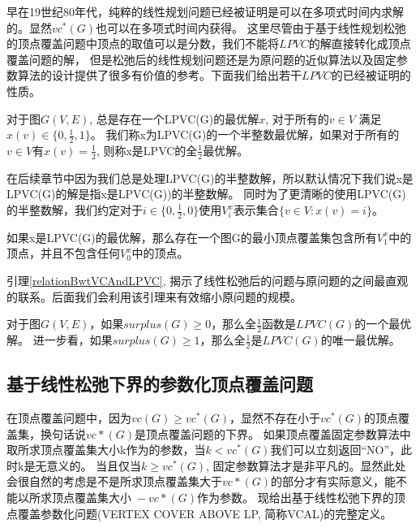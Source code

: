早在19世纪80年代，纯粹的线性规划问题已经被证明是可以在多项式时间内求解的\cite{khachiian1979polynomial}。显然$vc^{*}(G)$也可以在多项式时间内获得。
这里尽管由于基于线性规划松弛的顶点覆盖问题中顶点的取值可以是分数，我们不能将$LPVC$的解直接转化成顶点覆盖问题的解，
但是松弛后的线性规划问题还是为原问题的近似算法以及固定参数算法的设计提供了很多有价值的参考。下面我们给出若干$LPVC$的已经被证明的性质。
\begin{lemma}
对于图$G(V, E)$, 总是存在一个LPVC(G)的最优解$x$, 对于所有的$v \in V$ 满足$x(v) \in \{0, \frac{1}{2}, 1\}$。
我们称x为LPVC(G)的一个半整数最优解，如果对于所有的$v \in V$有$x(v) = \frac{1}{2}$, 则称x是LPVC的全$\frac{1}{2}$最优解。
\end{lemma}

在后续章节中因为我们总是处理LPVC(G)的半整数解，所以默认情况下我们说x是LPVC(G)的解是指x是LPVC(G))的半整数解。
同时为了更清晰的使用LPVC(G)的半整数解，我们约定对于$i \in \{0, \frac{1}{2}, 0\}$使用$V^x_i$表示集合$\{v \in V: x(v) = i\}$。

\begin{lemma}\label{relationBwtVCAndLPVC}
如果x是LPVC(G)的最优解，那么存在一个图G的最小顶点覆盖集包含所有$V^x_1$中的顶点，并且不包含任何$V^x_0$中的顶点。
\end{lemma}

引理\ref{relationBwtVCAndLPVC}, 揭示了线性松弛后的问题与原问题的之间最直观的联系。后面我们会利用该引理来有效缩小原问题的规模。

\begin{lemma}\label{relationBwtSurplusAndLPVC}
对于图$G(V, E)$，如果$surplus(G) \ge 0$，那么全$\frac{1}{2}$函数是$LPVC(G)$的一个最优解。
进一步看，如果$surplus(G) \ge 1$，那么全$\frac{1}{2}$是$LPVC(G)$的唯一最优解。
\end{lemma}

\subsection{基于线性松弛下界的参数化顶点覆盖问题}
在顶点覆盖问题中，因为$vc(G)\ge vc^*(G)$，显然不存在小于$vc^*(G)$的顶点覆盖集，换句话说$vc*(G)$是顶点覆盖问题的下界。
如果顶点覆盖固定参数算法中取所求顶点覆盖集大小k作为的参数，当$k < vc^*(G)$我们可以立刻返回“NO”，此时k是无意义的。
当且仅当$k \ge vc^*(G)$, 固定参数算法才是非平凡的。显然此处会很自然的考虑是不是所求顶点覆盖集大于$vc*(G)$的部分才有实际意义，能不能以$所求顶点覆盖集大小\; - vc*(G)$作为参数。
现给出基于线性松弛下界的顶点覆盖参数化问题(VERTEX COVER ABOVE LP, 简称VCAL)的完整定义。\\

